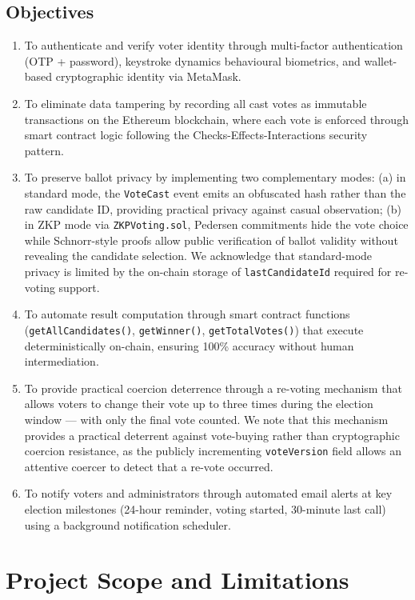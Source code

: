 \documentclass[oneside,a4paper,12pt]{book}
\begin{document}
\subsection{Objectives}
\begin{enumerate}[leftmargin=1.5cm]
    \item To authenticate and verify voter identity through multi-factor authentication (OTP + password), keystroke dynamics behavioural biometrics, and wallet-based cryptographic identity via MetaMask.
    \item To eliminate data tampering by recording all cast votes as immutable transactions on the Ethereum blockchain, where each vote is enforced through smart contract logic following the Checks-Effects-Interactions security pattern.
    \item To preserve ballot privacy by implementing two complementary modes: (a) in standard mode, the \texttt{VoteCast} event emits an obfuscated hash rather than the raw candidate ID, providing practical privacy against casual observation; (b) in ZKP mode via \texttt{ZKPVoting.sol}, Pedersen commitments hide the vote choice while Schnorr-style proofs allow public verification of ballot validity without revealing the candidate selection. We acknowledge that standard-mode privacy is limited by the on-chain storage of \texttt{lastCandidateId} required for re-voting support.
    \item To automate result computation through smart contract functions (\texttt{getAllCandidates()}, \texttt{getWinner()}, \texttt{getTotalVotes()}) that execute deterministically on-chain, ensuring 100\% accuracy without human intermediation.
    \item To provide practical coercion deterrence through a re-voting mechanism that allows voters to change their vote up to three times during the election window --- with only the final vote counted. We note that this mechanism provides a practical deterrent against vote-buying rather than cryptographic coercion resistance, as the publicly incrementing \texttt{voteVersion} field allows an attentive coercer to detect that a re-vote occurred.
    \item To notify voters and administrators through automated email alerts at key election milestones (24-hour reminder, voting started, 30-minute last call) using a background notification scheduler.
\end{enumerate}

\section{Project Scope and Limitations}
\end{document}
